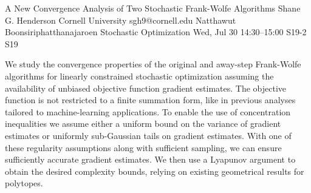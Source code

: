 \begin{talk}
  {A New Convergence Analysis of Two Stochastic Frank-Wolfe Algorithms}%
  {Shane G. Henderson}%
  {Cornell University}%
  {sgh9@cornell.edu}%
  {Natthawut Boonsiriphatthanajaroen}%
  {Stochastic Optimization}%
  {Wed, Jul 30 14:30--15:00}%
  {S19-2}%
  {S19}%
    
   
We study the convergence properties of the original and away-step
Frank-Wolfe algorithms for linearly constrained stochastic
optimization assuming the availability of unbiased objective function
gradient estimates. The objective function is not restricted to a
finite summation form, like in previous analyses tailored to
machine-learning applications. To enable the use of concentration
inequalities we assume either a uniform bound on the variance of
gradient estimates or uniformly sub-Gaussian tails on gradient
estimates. With one of these regularity assumptions along with
sufficient sampling, we can ensure sufficiently accurate gradient
estimates. We then use a Lyapunov argument to obtain the desired
complexity bounds, relying on existing geometrical results for
polytopes. 
\end{talk}

